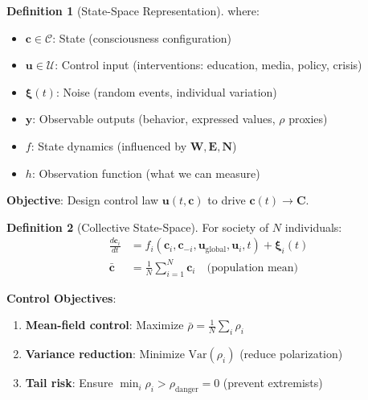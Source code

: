 \documentclass[11pt,a4paper]{article}
\theoremstyle{definition}
\newtheorem{definition}{Definition}[section]
\theoremstyle{remark}
\newcommand{\CC}{\mathcal{C}}
\newcommand{\EE}{\mathbf{E}}
\newcommand{\WW}{\mathbf{W}}
\newcommand{\cc}{\mathbf{c}}
\begin{document}
\begin{enumerate}
\begin{definition}[State-Space Representation]
where:
\begin{itemize}
    \item \(\cc \in \CC\): State (consciousness configuration)
    \item \(\mathbf{u} \in \mathcal{U}\): Control input (interventions: education, media, policy, crisis)
    \item \(\boldsymbol{\xi}(t)\): Noise (random events, individual variation)
    \item \(\mathbf{y}\): Observable outputs (behavior, expressed values, \(\rho\) proxies)
    \item \(f\): State dynamics (influenced by \(\WW, \EE, \mathbf{N}\))
    \item \(h\): Observation function (what we can measure)
\end{itemize}

\textbf{Objective}: Design control law \(\mathbf{u}(t, \cc)\) to drive \(\cc(t) \to \mathbf{C}\).
\end{definition}

\begin{definition}[Collective State-Space]
For society of \(N\) individuals:
\begin{align}
\frac{d\cc_i}{dt} &= f_i(\cc_i, \cc_{-i}, \mathbf{u}_{\text{global}}, \mathbf{u}_i, t) + \boldsymbol{\xi}_i(t) \\
\bar{\cc} &= \frac{1}{N}\sum_{i=1}^N \cc_i \quad \text{(population mean)}
\end{align}

\textbf{Control Objectives}:
\begin{enumerate}
    \item \textbf{Mean-field control}: Maximize \(\bar{\rho} = \frac{1}{N}\sum_i \rho_i\)
    \item \textbf{Variance reduction}: Minimize \(\text{Var}(\rho_i)\) (reduce polarization)
    \item \textbf{Tail risk}: Ensure \(\min_i \rho_i > \rho_{\text{danger}} = 0\) (prevent extremists)
\end{enumerate}
\end{definition}

\begin{figure}[H]
\centering
{}
\end{figure}
\end{enumerate}
\end{document}
